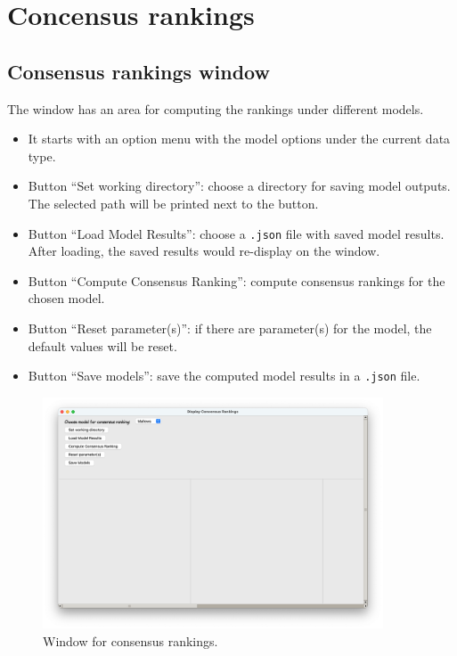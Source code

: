 \documentclass[a4paper,11pt]{memoir}
\begin{document}
\chapter{Concensus rankings}
\section{Consensus rankings window}\label{subsec:consensus}

The window has an area for computing the rankings under different models.
\begin{itemize}
  \item It starts with an option menu with the model options under the current data type.
  \item Button ``Set working directory'': choose a directory for saving model outputs. The selected path will be printed next to the button.
  \item Button ``Load Model Results'': choose a \texttt{.json} file with saved model results. After loading, the saved results would re-display on the window.
  \item Button ``Compute Consensus Ranking'': compute consensus rankings for the chosen model.
  \item Button ``Reset parameter(s)'': if there are parameter(s) for the model, the default values will be reset.
  \item Button ``Save models'': save the computed model results in a \texttt{.json} file.
\end{itemize}
  \begin{figure}
    \begin{center}
      \includegraphics[width=0.9\textwidth]{art/consensus.png}
      \caption{Window for consensus rankings.}\label{fig:consensus}
    \end{center}
  \end{figure}
\end{document}
